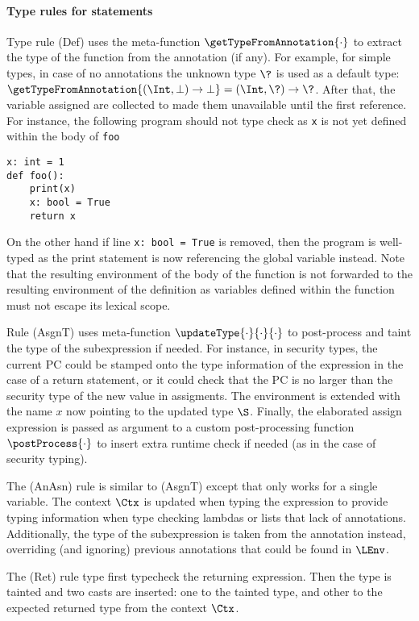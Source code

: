 \documentclass[acmsmall,anonymous,review,screen,nonacm]{acmart}
\begin{document}
\paragraph{Type rules for statements}
Type rule (Def) uses the meta-function $\getTypeFromAnnotation{\cdot}$ to extract the type of the function from the annotation (if any). For example, for simple types, in case of no annotations the unknown type $\?$ is used as a default type: $\getTypeFromAnnotation{(\Int, \bot) \to \bot} = (\Int, \?) \to \?$.
After that, the variable assigned are collected to made them unavailable until the first reference. For instance, the following program should not type check as \lstinline|x| is not yet defined within the body of \lstinline|foo| 
\begin{lstlisting}
x: int = 1
def foo():
    print(x)
    x: bool = True
    return x
\end{lstlisting}
On the other hand if line \lstinline|x: bool = True| is removed, then the program is well-typed as the print statement is now referencing the global variable instead.
%
Note that the resulting environment of the body of the function is not forwarded to the resulting environment of the definition as variables defined within the function must not escape its lexical scope.

Rule (AsgnT) uses meta-function $\updateType{\cdot}{\cdot}{\cdot}$ to post-process and taint the type of the subexpression if needed.  For instance, in security types, the current PC could be stamped onto the type information of the expression in the case of a return statement, or it could check that the PC is no larger than the security type of the new value in assigments.
The environment is extended with the name $x$ now pointing to the updated type $\S$.
Finally, the elaborated assign expression is passed as argument to a custom post-processing function $\postProcess{\cdot}$ to insert extra runtime check if needed (as in the case of security typing).

The (AnAsn) rule is similar to (AsgnT) except that only works for a single variable. The context $\Ctx$ is updated when typing the expression to provide typing information when type checking lambdas or lists that lack of annotations. Additionally, the type of the subexpression is taken from the annotation instead, overriding (and ignoring) previous annotations that could be found in $\LEnv$.

The (Ret) rule type first typecheck the returning expression. Then the type is tainted and two casts are inserted: one to the tainted type, and other to the expected returned type from the context $\Ctx$.
\end{document}
